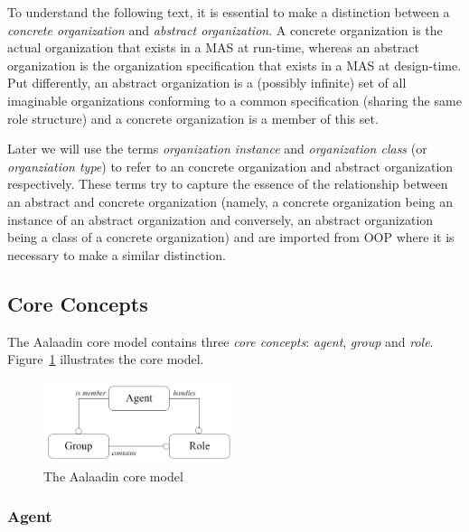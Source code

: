 To understand the following text, it is essential to make a distinction between a \textit{concrete organization} and \textit{abstract organization}.
A concrete organization is the actual organization that exists in a MAS at run-time, whereas an abstract organization is the organization specification that exists in a MAS at design-time.
Put differently, an abstract organization is a (possibly infinite) set of all imaginable organizations conforming to a common specification (sharing the same role structure) and a concrete organization is a member of this set.

Later we will use the terms \textit{organization instance} and \textit{organization class} (or \textit{organziation type}) to refer to an concrete organization and abstract organization respectively.
These terms try to capture the essence of the relationship between an abstract and concrete organization (namely, a concrete organization being an instance of an abstract organization and conversely, an abstract organization being a class of a concrete organization) and are imported from OOP where it is necessary to make a similar distinction. 

\subsection{Core Concepts}

The Aalaadin core model contains three \textit{core concepts}: \textit{agent}, \textit{group} and \textit{role}.
Figure~\ref{figure:aalaadin-core-model} illustrates the core model.

\begin{figure}[h]
	\centering
	\includegraphics[width=0.5\textwidth]{images/aalaadin/core-model.png}
	\caption{The Aalaadin core model}
	\label{figure:aalaadin-core-model}
\end{figure}

\subsubsection*{Agent}


